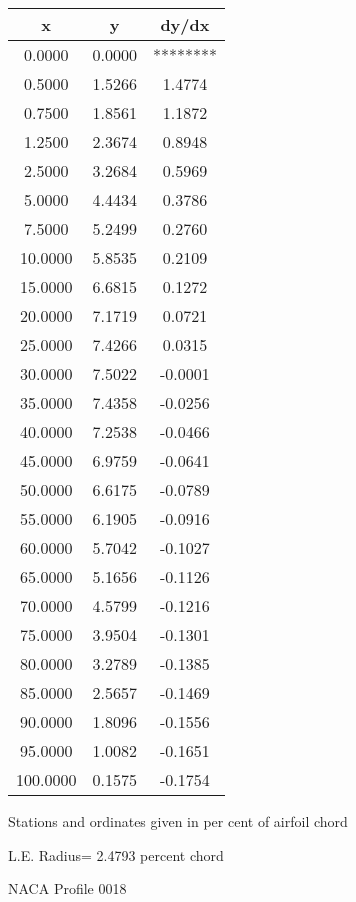 \documentclass[11pt]{book}
\begin{document}
 \vspace{8mm}
 \begin{tabular}{|c|c|c|} \hline 
  x  &  y  &  dy/dx \\
 \hline
0.0000 & 0.0000 & ******** \\
0.5000 & 1.5266 & 1.4774 \\
0.7500 & 1.8561 & 1.1872 \\
1.2500 & 2.3674 & 0.8948 \\
2.5000 & 3.2684 & 0.5969 \\
5.0000 & 4.4434 & 0.3786 \\
7.5000 & 5.2499 & 0.2760 \\
10.0000 & 5.8535 & 0.2109 \\
15.0000 & 6.6815 & 0.1272 \\
20.0000 & 7.1719 & 0.0721 \\
25.0000 & 7.4266 & 0.0315 \\
30.0000 & 7.5022 & -0.0001 \\
35.0000 & 7.4358 & -0.0256 \\
40.0000 & 7.2538 & -0.0466 \\
45.0000 & 6.9759 & -0.0641 \\
50.0000 & 6.6175 & -0.0789 \\
55.0000 & 6.1905 & -0.0916 \\
60.0000 & 5.7042 & -0.1027 \\
65.0000 & 5.1656 & -0.1126 \\
70.0000 & 4.5799 & -0.1216 \\
75.0000 & 3.9504 & -0.1301 \\
80.0000 & 3.2789 & -0.1385 \\
85.0000 & 2.5657 & -0.1469 \\
90.0000 & 1.8096 & -0.1556 \\
95.0000 & 1.0082 & -0.1651 \\
100.0000 & 0.1575 & -0.1754 \\
 \hline
 \end{tabular}
 \vspace{8mm}


Stations and ordinates given in per cent of airfoil chord 


L.E. Radius=  2.4793 percent chord
 \newpage
  \label{p0018}
 \begin{Large}
 NACA Profile 0018
 \end{Large}
  
\end{document}
